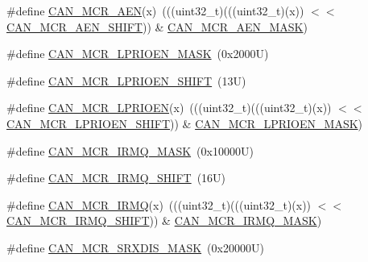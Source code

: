 \begin{DoxyCompactItemize}
\item 
\#define \mbox{\hyperlink{group___c_a_n___register___masks_gaa2fb502edd0ac4e4d316eb75eec68335}{C\+A\+N\+\_\+\+M\+C\+R\+\_\+\+A\+EN}}(x)~(((uint32\+\_\+t)(((uint32\+\_\+t)(x)) $<$$<$ \mbox{\hyperlink{group___c_a_n___register___masks_ga6c610bd65cb9471ad0ca511dbe2c86d4}{C\+A\+N\+\_\+\+M\+C\+R\+\_\+\+A\+E\+N\+\_\+\+S\+H\+I\+FT}})) \& \mbox{\hyperlink{group___c_a_n___register___masks_gaf788111bd2bf9a69160d0a0cb713c926}{C\+A\+N\+\_\+\+M\+C\+R\+\_\+\+A\+E\+N\+\_\+\+M\+A\+SK}})
\item 
\#define \mbox{\hyperlink{group___c_a_n___register___masks_ga1420cc0cb40d414296a741397ee07116}{C\+A\+N\+\_\+\+M\+C\+R\+\_\+\+L\+P\+R\+I\+O\+E\+N\+\_\+\+M\+A\+SK}}~(0x2000\+U)
\item 
\#define \mbox{\hyperlink{group___c_a_n___register___masks_gaaf89fabb5183062196edf8dc4a3f6770}{C\+A\+N\+\_\+\+M\+C\+R\+\_\+\+L\+P\+R\+I\+O\+E\+N\+\_\+\+S\+H\+I\+FT}}~(13\+U)
\item 
\#define \mbox{\hyperlink{group___c_a_n___register___masks_gaefb54a6e0f58b9146a8c05e9f5f34ff9}{C\+A\+N\+\_\+\+M\+C\+R\+\_\+\+L\+P\+R\+I\+O\+EN}}(x)~(((uint32\+\_\+t)(((uint32\+\_\+t)(x)) $<$$<$ \mbox{\hyperlink{group___c_a_n___register___masks_gaaf89fabb5183062196edf8dc4a3f6770}{C\+A\+N\+\_\+\+M\+C\+R\+\_\+\+L\+P\+R\+I\+O\+E\+N\+\_\+\+S\+H\+I\+FT}})) \& \mbox{\hyperlink{group___c_a_n___register___masks_ga1420cc0cb40d414296a741397ee07116}{C\+A\+N\+\_\+\+M\+C\+R\+\_\+\+L\+P\+R\+I\+O\+E\+N\+\_\+\+M\+A\+SK}})
\item 
\#define \mbox{\hyperlink{group___c_a_n___register___masks_gad68843c21c6243f255601d8973f4e7eb}{C\+A\+N\+\_\+\+M\+C\+R\+\_\+\+I\+R\+M\+Q\+\_\+\+M\+A\+SK}}~(0x10000\+U)
\item 
\#define \mbox{\hyperlink{group___c_a_n___register___masks_gae30b928fb3ce512c48cb0be04af69acd}{C\+A\+N\+\_\+\+M\+C\+R\+\_\+\+I\+R\+M\+Q\+\_\+\+S\+H\+I\+FT}}~(16\+U)
\item 
\#define \mbox{\hyperlink{group___c_a_n___register___masks_ga5f8d329fa60f2a124132e1166003e5f7}{C\+A\+N\+\_\+\+M\+C\+R\+\_\+\+I\+R\+MQ}}(x)~(((uint32\+\_\+t)(((uint32\+\_\+t)(x)) $<$$<$ \mbox{\hyperlink{group___c_a_n___register___masks_gae30b928fb3ce512c48cb0be04af69acd}{C\+A\+N\+\_\+\+M\+C\+R\+\_\+\+I\+R\+M\+Q\+\_\+\+S\+H\+I\+FT}})) \& \mbox{\hyperlink{group___c_a_n___register___masks_gad68843c21c6243f255601d8973f4e7eb}{C\+A\+N\+\_\+\+M\+C\+R\+\_\+\+I\+R\+M\+Q\+\_\+\+M\+A\+SK}})
\item 
\#define \mbox{\hyperlink{group___c_a_n___register___masks_ga29b3d428d19a7204c53f56c7467172f1}{C\+A\+N\+\_\+\+M\+C\+R\+\_\+\+S\+R\+X\+D\+I\+S\+\_\+\+M\+A\+SK}}~(0x20000\+U)
$$
\end{DoxyCompactItemize}
